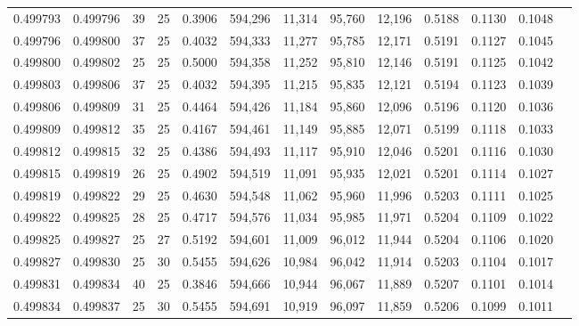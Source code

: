 \begin{tabular}{rrrrrrrrrrrrr}
0.499793 & 0.499796 &    39 &  25 &                                     0.3906 & 594,296 &  11,314 &  95,760 &  12,196 & 0.5188 & 0.1130 & 0.1048 \\
0.499796 & 0.499800 &    37 &  25 &                                     0.4032 & 594,333 &  11,277 &  95,785 &  12,171 & 0.5191 & 0.1127 & 0.1045 \\
0.499800 & 0.499802 &    25 &  25 &                                     0.5000 & 594,358 &  11,252 &  95,810 &  12,146 & 0.5191 & 0.1125 & 0.1042 \\
0.499803 & 0.499806 &    37 &  25 &                                     0.4032 & 594,395 &  11,215 &  95,835 &  12,121 & 0.5194 & 0.1123 & 0.1039 \\
0.499806 & 0.499809 &    31 &  25 &                                     0.4464 & 594,426 &  11,184 &  95,860 &  12,096 & 0.5196 & 0.1120 & 0.1036 \\
0.499809 & 0.499812 &    35 &  25 &                                     0.4167 & 594,461 &  11,149 &  95,885 &  12,071 & 0.5199 & 0.1118 & 0.1033 \\
0.499812 & 0.499815 &    32 &  25 &                                     0.4386 & 594,493 &  11,117 &  95,910 &  12,046 & 0.5201 & 0.1116 & 0.1030 \\
0.499815 & 0.499819 &    26 &  25 &                                     0.4902 & 594,519 &  11,091 &  95,935 &  12,021 & 0.5201 & 0.1114 & 0.1027 \\
0.499819 & 0.499822 &    29 &  25 &                                     0.4630 & 594,548 &  11,062 &  95,960 &  11,996 & 0.5203 & 0.1111 & 0.1025 \\
0.499822 & 0.499825 &    28 &  25 &                                     0.4717 & 594,576 &  11,034 &  95,985 &  11,971 & 0.5204 & 0.1109 & 0.1022 \\
0.499825 & 0.499827 &    25 &  27 &                                     0.5192 & 594,601 &  11,009 &  96,012 &  11,944 & 0.5204 & 0.1106 & 0.1020 \\
0.499827 & 0.499830 &    25 &  30 &                                     0.5455 & 594,626 &  10,984 &  96,042 &  11,914 & 0.5203 & 0.1104 & 0.1017 \\
0.499831 & 0.499834 &    40 &  25 &                                     0.3846 & 594,666 &  10,944 &  96,067 &  11,889 & 0.5207 & 0.1101 & 0.1014 \\
0.499834 & 0.499837 &    25 &  30 &                                     0.5455 & 594,691 &  10,919 &  96,097 &  11,859 & 0.5206 & 0.1099 & 0.1011 \\

\end{tabular}
